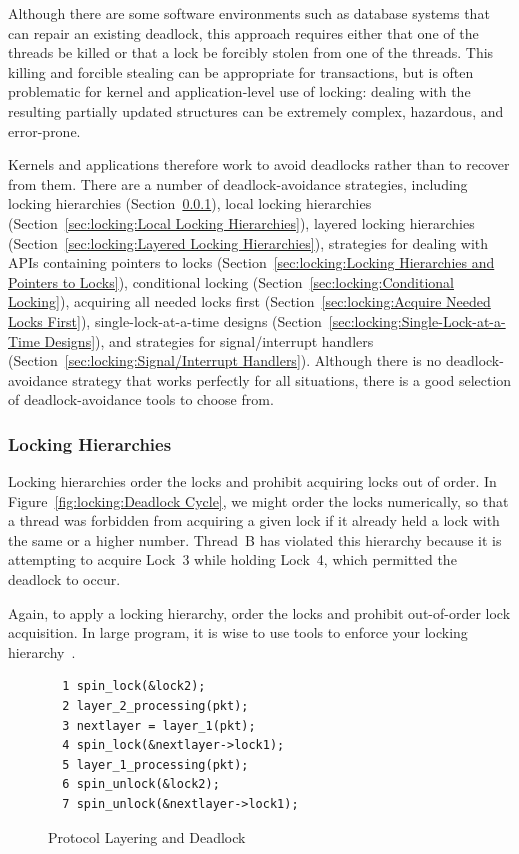Although there are some software environments such as database systems
that can repair an existing deadlock, this approach requires either that
one of the threads be killed or that a lock be forcibly stolen from one
of the threads.
This killing and forcible stealing can be appropriate for transactions,
but is often problematic for kernel and application-level use of locking:
dealing with the resulting partially updated structures can be extremely
complex, hazardous, and error-prone.

Kernels and applications therefore work to avoid deadlocks rather than to
recover from them.
There are a number of deadlock-avoidance strategies,
including locking hierarchies
(Section~\ref{sec:locking:Locking Hierarchies}),
local locking hierarchies
(Section~\ref{sec:locking:Local Locking Hierarchies}),
layered locking hierarchies
(Section~\ref{sec:locking:Layered Locking Hierarchies}),
strategies for dealing with APIs containing pointers to locks
(Section~\ref{sec:locking:Locking Hierarchies and Pointers to Locks}),
conditional locking
(Section~\ref{sec:locking:Conditional Locking}),
acquiring all needed locks first
(Section~\ref{sec:locking:Acquire Needed Locks First}),
single-lock-at-a-time designs
(Section~\ref{sec:locking:Single-Lock-at-a-Time Designs}),
and strategies for signal/interrupt handlers
(Section~\ref{sec:locking:Signal/Interrupt Handlers}).
Although there is no deadlock-avoidance strategy that works perfectly
for all situations, there is a good selection of deadlock-avoidance
tools to choose from.

\subsubsection{Locking Hierarchies}
\label{sec:locking:Locking Hierarchies}

Locking hierarchies order the locks and prohibit acquiring locks out
of order.
In Figure~\ref{fig:locking:Deadlock Cycle},
we might order the locks numerically, so that a thread was
forbidden from acquiring a given lock if it already held a lock
with the same or a higher number.
Thread~B has violated this hierarchy because it is attempting to
acquire Lock~3 while holding Lock~4, which permitted the deadlock
to occur.

Again, to apply a locking hierarchy, order the locks and prohibit
out-of-order lock acquisition.
In large program, it is wise to use tools to enforce your locking
hierarchy~\cite{JonathanCorbet2006lockdep}.

\begin{figure}[tbp]
{ \scriptsize
\begin{verbatim}
  1 spin_lock(&lock2);
  2 layer_2_processing(pkt);
  3 nextlayer = layer_1(pkt);
  4 spin_lock(&nextlayer->lock1);
  5 layer_1_processing(pkt);
  6 spin_unlock(&lock2);
  7 spin_unlock(&nextlayer->lock1);
\end{verbatim}
}
\caption{Protocol Layering and Deadlock}
\label{fig:locking:Protocol Layering and Deadlock}
\end{figure}

